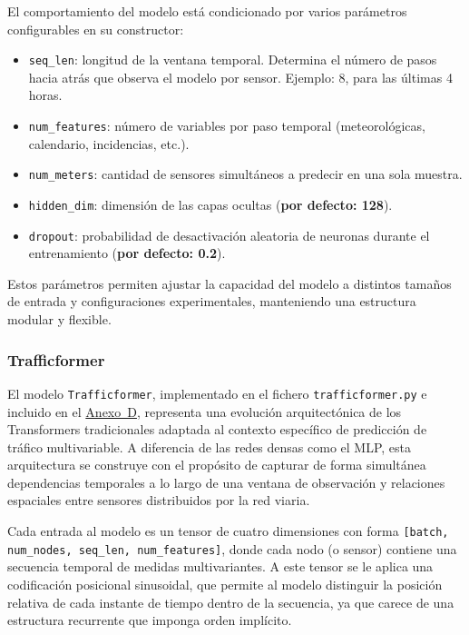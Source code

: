 El comportamiento del modelo está condicionado por varios parámetros configurables en su constructor:

\begin{itemize}
	\item \texttt{seq\_len}: longitud de la ventana temporal. Determina el número de pasos hacia atrás que observa el modelo por sensor. Ejemplo: 8, para las últimas 4 horas.
	\item \texttt{num\_features}: número de variables por paso temporal (meteorológicas, calendario, incidencias, etc.).
	\item \texttt{num\_meters}: cantidad de sensores simultáneos a predecir en una sola muestra.
	\item \texttt{hidden\_dim}: dimensión de las capas ocultas (\textbf{por defecto: 128}).
	\item \texttt{dropout}: probabilidad de desactivación aleatoria de neuronas durante el entrenamiento (\textbf{por defecto: 0.2}).
\end{itemize}

Estos parámetros permiten ajustar la capacidad del modelo a distintos tamaños de entrada y configuraciones experimentales, manteniendo una estructura modular y flexible.

\subsubsection*{Trafficformer}

El modelo \texttt{Trafficformer}, implementado en el fichero \texttt{trafficformer.py} e incluido en el \hyperref[anexo:codigo_trafficformer]{Anexo~D}, representa una evolución arquitectónica de los Transformers tradicionales adaptada al contexto específico de predicción de tráfico multivariable. A diferencia de las redes densas como el MLP, esta arquitectura se construye con el propósito de capturar de forma simultánea dependencias temporales a lo largo de una ventana de observación y relaciones espaciales entre sensores distribuidos por la red viaria.

Cada entrada al modelo es un tensor de cuatro dimensiones con forma \texttt{[batch, num\_nodes, seq\_len, num\_features]}, donde cada nodo (o sensor) contiene una secuencia temporal de medidas multivariantes. A este tensor se le aplica una codificación posicional sinusoidal, que permite al modelo distinguir la posición relativa de cada instante de tiempo dentro de la secuencia, ya que carece de una estructura recurrente que imponga orden implícito.

